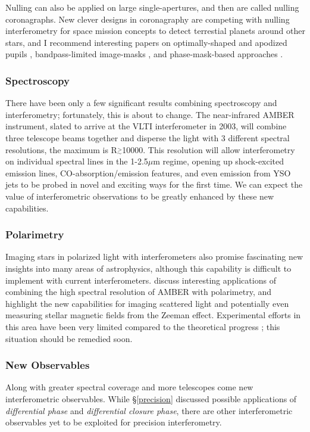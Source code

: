 \documentclass[12pt]{iopart}
\newcommand{\simge}{\mbox{$\stackrel{>}{_{\sim}}$}}
\begin{document}
Nulling can also be applied on large single-apertures, and then are
called nulling coronagraphs.  New clever designs in coronagraphy are
competing with nulling interferometry for space mission concepts to
detect    terrestial planets around other stars, and I recommend
interesting papers on optimally-shaped 
and apodized pupils \citep{spergel2002,papa2001},
bandpass-limited image-masks \citep{kuchner2002}, and phase-mask-based
approaches \citep[e.g.,][]{guyon1999,rouan2000}.

\subsubsection{Spectroscopy}
There have been only a few significant results combining spectroscopy
and interferometry; fortunately, this is about to change.  The
near-infrared AMBER instrument, slated to arrive at the VLTI
interferometer in 2003, will combine three telescope beams together
and disperse the light with 3 different spectral resolutions, the
maximum is R$\simge$10000.  This resolution will allow interferometry
on individual spectral lines in the 1-2.5$\mu$m regime, opening up
shock-excited emission lines, CO-absorption/emission features, and even
emission from YSO jets to be probed in novel and exciting ways for the
first time.  We can expect the value of interferometric observations
to be greatly enhanced by these new capabilities.

\subsubsection{Polarimetry}
Imaging stars in polarized light with interferometers also promise
fascinating new insights into many areas of astrophysics, although
this capability is difficult to implement with current interferometers.
\citet{vakili2002} discuss interesting applications of combining the
high spectral resolution of AMBER with polarimetry, and highlight the
new capabilities for imaging scattered light and potentially even
measuring stellar magnetic fields from the Zeeman effect.
Experimental efforts \citep{RP1997} in this area have been very
limited compared to the theoretical progress
\citep{RP2000}; this situation should be remedied soon.

\subsubsection{New Observables}
Along with greater spectral coverage and more telescopes come new
interferometric observables. While \S\ref{precision} discussed
possible applications of {\em differential phase} and {\em
  differential closure phase}, there are other interferometric
observables yet to be exploited for precision interferometry.
\end{document}
